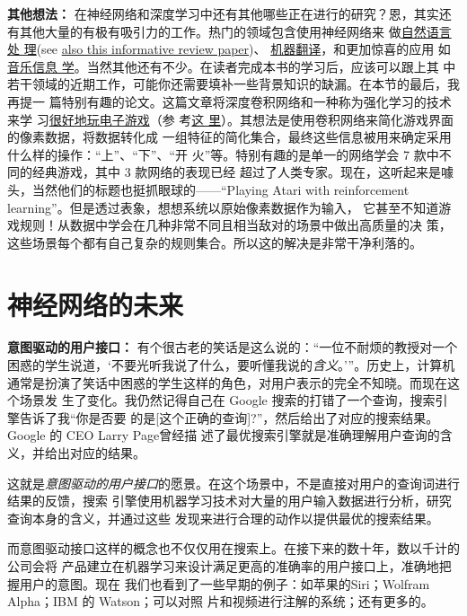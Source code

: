 \textbf{其他想法：} 在神经网络和深度学习中还有其他哪些正在进行的研究？恩，其实还
有其他大量的有极有吸引力的工作。热门的领域包含使用神经网络来
做\href{http://machinelearning.org/archive/icml2008/papers/391.pdf}{自然语言处
  理}(see \href{http://arxiv.org/abs/1103.0398}{also
  this informative review
  paper})、
\href{http://papers.nips.cc/paper/5346-information-based-learning-by-agents-in-unbounded-state-spaces}{机器翻译}，和更加惊喜的应用
如\href{http://yann.lecun.com/exdb/publis/pdf/humphrey-jiis-13.pdf}{音乐信息
  学}。当然其他还有不少。在读者完成本书的学习后，应该可以跟上其
中若干领域的近期工作，可能你还需要填补一些背景知识的缺漏。在本节的最后，我再提一
篇特别有趣的论文。这篇文章将深度卷积网络和一种称为强化学习的技术来学
习\href{http://www.cs.toronto.edu/~vmnih/docs/dqn.pdf}{很好地玩电子游戏}（参
考\href{http://www.nature.com/nature/journal/v518/n7540/abs/nature14236.html}{这
  里}）。其想法是使用卷积网络来简化游戏界面的像素数据，将数据转化成
一组特征的简化集合，最终这些信息被用来确定采用什么样的操作：“上”、“下”、“开
火”等。特别有趣的是单一的网络学会 7 款中不同的经典游戏，其中 3 款网络的表现已经
超过了人类专家。现在，这听起来是噱头，当然他们的标题也挺抓眼球的——“Playing
Atari with reinforcement learning”。但是透过表象，想想系统以原始像素数据作为输入，
它甚至不知道游戏规则！从数据中学会在几种非常不同且相当敌对的场景中做出高质量的决
策，这些场景每个都有自己复杂的规则集合。所以这的解决是非常干净利落的。

\section{神经网络的未来}
\label{sec:on_the_future_of_neural_networks}

\textbf{意图驱动的用户接口：} 有个很古老的笑话是这么说的：“一位不耐烦的教授对一个
困惑的学生说道，‘不要光听我说了什么，要听懂我说的\emph{含义}。’”。历史上，计算机
通常是扮演了笑话中困惑的学生这样的角色，对用户表示的完全不知晓。而现在这个场景发
生了变化。我仍然记得自己在 Google 搜索的打错了一个查询，搜索引擎告诉了我“你是否要
的是[这个正确的查询]?”，然后给出了对应的搜索结果。Google 的 CEO Larry Page曾经描
述了最优搜索引擎就是准确理解用户查询的含义，并给出对应的结果。

这就是\emph{意图驱动的用户接口}的愿景。在这个场景中，不是直接对用户的查询词进行结果的反馈，搜索
引擎使用机器学习技术对大量的用户输入数据进行分析，研究查询本身的含义，并通过这些
发现来进行合理的动作以提供最优的搜索结果。

而意图驱动接口这样的概念也不仅仅用在搜索上。在接下来的数十年，数以千计的公司会将
产品建立在机器学习来设计满足更高的准确率的用户接口上，准确地把握用户的意图。现在
我们也看到了一些早期的例子：如苹果的Siri；Wolfram Alpha；IBM 的 Watson；可以对照
片和视频进行注解的系统；还有更多的。

